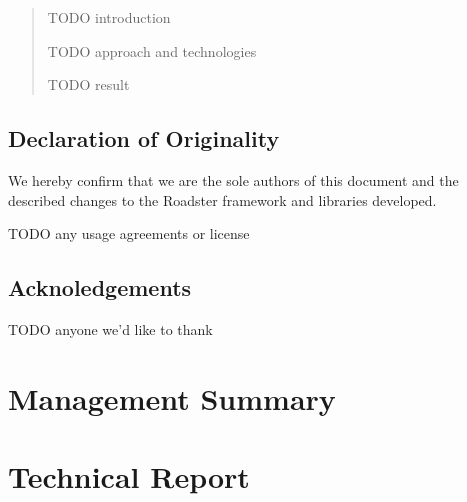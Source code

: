 \documentclass[a4paper]{report}
\begin{document}
\begin{abstract}

TODO introduction

TODO approach and technologies

TODO result

\end{abstract}

\chapter*{Declaration of Originality}
We hereby confirm that we are the sole authors of this document and the
described changes to the Roadster framework and libraries developed.

TODO any usage agreements or license
%

\chapter*{Acknoledgements}
TODO anyone we'd like to thank

\tableofcontents
\listoffigures
\listoftables
\lstlistoflistings

\pagebreak
{}
\setcounter{page}{1}

\part{Management Summary}\label{part:mgmtsummary}


\part{Technical Report}






\printbibliography
\printglossaries
\end{document}
